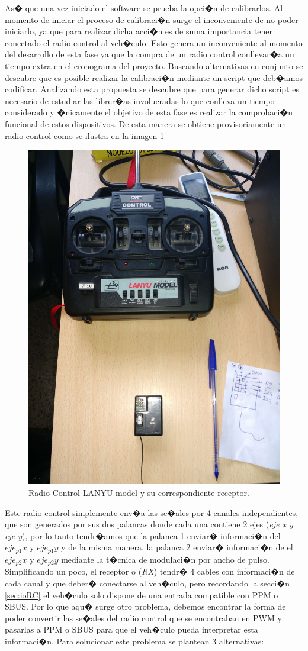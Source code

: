 		As� que una vez iniciado el software se prueba la opci�n de calibrarlos. Al momento de iniciar el proceso de calibraci�n surge el inconveniente de no poder iniciarlo, ya que para realizar dicha acci�n es de suma importancia tener conectado el radio control al veh�culo. Esto genera un inconveniente al momento del desarrollo de esta fase ya que la compra de un radio control conllevar�a un tiempo extra en el cronograma del proyecto. Buscando alternativas en conjunto se descubre que es posible realizar la calibraci�n mediante un script que deb�amos codificar. Analizando esta propuesta se descubre que para generar dicho script es necesario de estudiar las librer�as involucradas lo que conlleva un tiempo considerado y �nicamente el objetivo de esta fase es realizar la comprobaci�n funcional de estos dispositivos. De esta manera se obtiene provisoriamente un radio control como se ilustra en la imagen \ref{fig:radiocontrol}
		
		\begin{figure}[h!]
		\centering
		\includegraphics[width=0.5\linewidth, height=0.5\textheight]{Imagenes/fotos/rc_control_receptor}
		\caption{Radio Control LANYU model y su correspondiente receptor.}
		\label{fig:radiocontrol}
		\end{figure}
		
		Este radio control simplemente env�a las se�ales por 4 canales independientes, que son generados por sus dos palancas donde cada una contiene 2 ejes (\textit{eje x y eje y}), por lo tanto tendr�amos que la palanca 1 enviar� informaci�n del $eje_{p1} x$ y $eje_{p1} y$ y de la misma manera, la palanca 2 enviar� informaci�n de el $eje_{p2} x$ y $eje_{p2} y$ mediante la t�cnica de modulaci�n por ancho de pulso. Simplificando un poco, el receptor o (\textit{RX})  tendr� 4 cables con informaci�n de cada canal y que deber� conectarse al veh�culo, pero recordando la secci�n \ref{sec:ioRC} el veh�culo solo dispone de una entrada compatible con PPM o SBUS. Por lo que aqu� surge otro problema, debemos encontrar la forma de poder convertir las se�ales del radio control que se encontraban en PWM y pasarlas a PPM o SBUS para que el veh�culo pueda interpretar esta informaci�n. Para solucionar este problema se plantean 3 alternativas:
		
